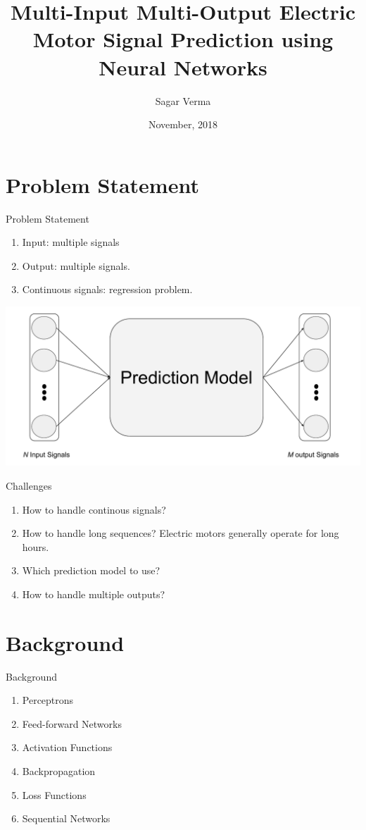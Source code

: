 \documentclass[handout]{beamer}
\title[ \insertdate]{Multi-Input Multi-Output Electric Motor Signal Prediction using Neural Networks}
\author{Sagar Verma}
\institute[Centralesup\'elec and Schneider Electric] %
{
  Centre de Vision Num\'erique,\\
  Centralesup\'elec, Gif-sur-Yvette}
\date{November, 2018}
\begin{document}
\begin{frame}
\titlepage
\end{frame}

\section{Problem Statement}

\begin{frame}{Problem Statement}
\begin{center}
\begin{enumerate}
  \item Input: multiple signals
  \item Output: multiple signals.
  \item Continuous signals: regression problem.
\end{enumerate}
\vspace{.5cm}
\includegraphics[width=1\linewidth]{images/teaser}
\end{center}
\end{frame}


\begin{frame}{Challenges}
  \begin{enumerate}
    \item How to handle continous signals?
    \item How to handle long sequences? Electric motors generally operate for long hours.
    \item Which prediction model to use?
    \item How to handle multiple outputs?
  \end{enumerate}
\end{frame}

\section{Background}
\begin{frame}{Background}
  \begin{enumerate}
    \item Perceptrons
    \item Feed-forward Networks
    \item Activation Functions
    \item Backpropagation
    \item Loss Functions
    \item Sequential Networks
  \end{enumerate}
\end{frame}
\end{document}
